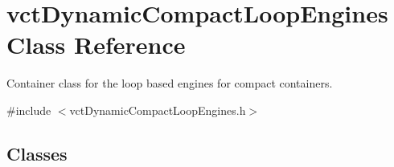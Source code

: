 \hypertarget{classvct_dynamic_compact_loop_engines}{}\section{vct\+Dynamic\+Compact\+Loop\+Engines Class Reference}
\label{classvct_dynamic_compact_loop_engines}


Container class for the loop based engines for compact containers.  




{\ttfamily \#include $<$vct\+Dynamic\+Compact\+Loop\+Engines.\+h$>$}

\subsection*{Classes}
